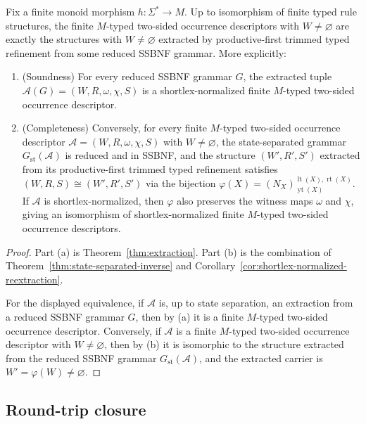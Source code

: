 \documentclass[sub]{jalc}
\newcommand{\yt}{\operatorname{yt}}
\newcommand{\lt}{\operatorname{lt}}
\newcommand{\rt}{\operatorname{rt}}
\begin{document}
\begin{theorem}[Characterization]
\label{thm:characterization}
Fix a finite monoid morphism \(h:\Sigma^*\to M\). Up to isomorphism of finite typed rule structures, the finite \(M\)-typed two-sided occurrence descriptors with \(W\neq\varnothing\) are exactly the structures with \(W\neq\varnothing\) extracted by productive-first trimmed typed refinement from some reduced SSBNF grammar. More explicitly:
\begin{enumerate}[label=\textup{(\alph*)},leftmargin=2.4em]
\item \textup{(Soundness)} For every reduced SSBNF grammar \(G\), the extracted tuple \(\mathcal A(G)=(W,R,\omega,\chi,S)\) is a shortlex-normalized finite \(M\)-typed two-sided occurrence descriptor.
\item \textup{(Completeness)} Conversely, for every finite \(M\)-typed two-sided occurrence descriptor \(\mathcal A=(W,R,\omega,\chi,S)\) with \(W\neq\varnothing\), the state-separated grammar \(G_{\mathrm{st}}(\mathcal A)\) is reduced and in SSBNF, and the structure \((W',R',S')\) extracted from its productive-first trimmed typed refinement satisfies \((W,R,S)\cong(W',R',S')\) via the bijection \(\varphi(X)=(N_X)_{\yt(X)}^{\lt(X),\rt(X)}\). If \(\mathcal A\) is shortlex-normalized, then \(\varphi\) also preserves the witness maps \(\omega\) and \(\chi\), giving an isomorphism of shortlex-normalized finite \(M\)-typed two-sided occurrence descriptors.
\end{enumerate}
\end{theorem}

\begin{proof}
Part (a) is Theorem~\ref{thm:extraction}. Part (b) is the combination of Theorem~\ref{thm:state-separated-inverse} and Corollary~\ref{cor:shortlex-normalized-reextraction}.

For the displayed equivalence, if \(\mathcal A\) is, up to state separation, an extraction from a reduced SSBNF grammar \(G\), then by (a) it is a finite \(M\)-typed two-sided occurrence descriptor. Conversely, if \(\mathcal A\) is a finite \(M\)-typed two-sided occurrence descriptor with \(W\neq\varnothing\), then by (b) it is isomorphic to the structure extracted from the reduced SSBNF grammar \(G_{\mathrm{st}}(\mathcal A)\), and the extracted carrier is \(W'=\varphi(W)\neq\varnothing\).
\end{proof}

\subsection{Round-trip closure}
\label{subsec:round-trip-closure}
\end{document}
